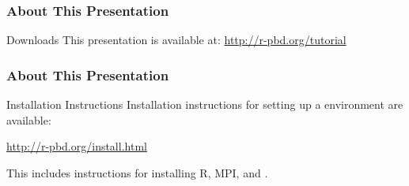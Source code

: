 \begin{frame}
\frametitle{About This Presentation}
 \begin{block}{Downloads}
  This presentation is available at: \url{http://r-pbd.org/tutorial}
 \end{block}
\end{frame}





\begin{frame}
\frametitle{About This Presentation}
 \begin{block}{Installation Instructions}
  Installation instructions for setting up a \pbdR environment are available:
  \begin{center}
  \url{http://r-pbd.org/install.html}
  \end{center}
  This includes instructions for installing R, MPI, and \pbdR.
 \end{block}
\end{frame}






